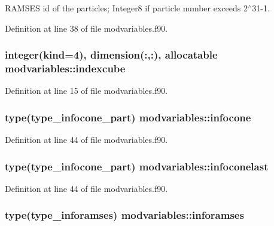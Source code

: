 R\+A\+M\+S\+ES id of the particles; Integer8 if particle number exceeds 2$^\wedge$31-\/1. 



Definition at line 38 of file modvariables.\+f90.

\subsubsection[{\texorpdfstring{indexcube}{indexcube}}]{\setlength{\rightskip}{0pt plus 5cm}integer(kind=4), dimension(\+:,\+:), allocatable modvariables\+::indexcube}\hypertarget{namespacemodvariables_a46e17f78883958892917ac536b4ab1b1}{}\label{namespacemodvariables_a46e17f78883958892917ac536b4ab1b1}


Definition at line 15 of file modvariables.\+f90.

\subsubsection[{\texorpdfstring{infocone}{infocone}}]{\setlength{\rightskip}{0pt plus 5cm}type({\bf type\+\_\+infocone\+\_\+part}) modvariables\+::infocone}\hypertarget{namespacemodvariables_a9c451543a6252b72d4a5352333c718b9}{}\label{namespacemodvariables_a9c451543a6252b72d4a5352333c718b9}


Definition at line 44 of file modvariables.\+f90.

\subsubsection[{\texorpdfstring{infoconelast}{infoconelast}}]{\setlength{\rightskip}{0pt plus 5cm}type({\bf type\+\_\+infocone\+\_\+part}) modvariables\+::infoconelast}\hypertarget{namespacemodvariables_acecda25ec5fba6f5f5fcaa09b2aba3a2}{}\label{namespacemodvariables_acecda25ec5fba6f5f5fcaa09b2aba3a2}


Definition at line 44 of file modvariables.\+f90.

\subsubsection[{\texorpdfstring{inforamses}{inforamses}}]{\setlength{\rightskip}{0pt plus 5cm}type({\bf type\+\_\+inforamses}) modvariables\+::inforamses}\hypertarget{namespacemodvariables_ac84b14c43266126c4d7120ba0b8f48f4}{}\label{namespacemodvariables_ac84b14c43266126c4d7120ba0b8f48f4}


